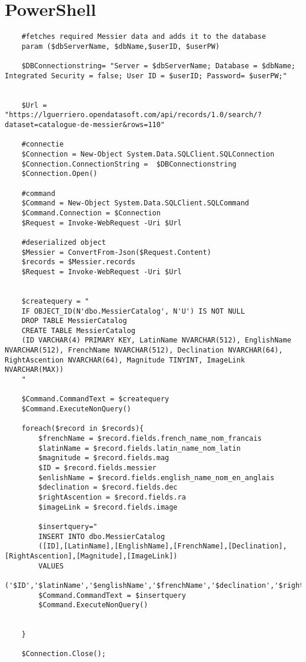 \documentclass[dutch,dit,thesis]{hogentreport}
\begin{document}
\section{PowerShell}
\label{sec:Powershell}
\begin{lstlisting}
    #fetches required Messier data and adds it to the database
    param ($dbServerName, $dbName,$userID, $userPW)

    $DBConnectionstring= "Server = $dbServerName; Database = $dbName; Integrated Security = false; User ID = $userID; Password= $userPW;"


    $Url = "https://lguerriero.opendatasoft.com/api/records/1.0/search/?dataset=catalogue-de-messier&rows=110"

    #connectie
    $Connection = New-Object System.Data.SQLClient.SQLConnection
    $Connection.ConnectionString =  $DBConnectionstring
    $Connection.Open()

    #command
    $Command = New-Object System.Data.SQLClient.SQLCommand
    $Command.Connection = $Connection
    $Request = Invoke-WebRequest -Uri $Url

    #deserialized object
    $Messier = ConvertFrom-Json($Request.Content)
    $records = $Messier.records
    $Request = Invoke-WebRequest -Uri $Url


    $createquery = "
    IF OBJECT_ID(N'dbo.MessierCatalog', N'U') IS NOT NULL
    DROP TABLE MessierCatalog
    CREATE TABLE MessierCatalog
    (ID VARCHAR(4) PRIMARY KEY, LatinName NVARCHAR(512), EnglishName NVARCHAR(512), FrenchName NVARCHAR(512), Declination NVARCHAR(64), RightAscention NVARCHAR(64), Magnitude TINYINT,	ImageLink NVARCHAR(MAX))
    "

    $Command.CommandText = $createquery
    $Command.ExecuteNonQuery()

    foreach($record in $records){
        $frenchName = $record.fields.french_name_nom_francais
        $latinName = $record.fields.latin_name_nom_latin
        $magnitude = $record.fields.mag
        $ID = $record.fields.messier
        $enlishName = $record.fields.english_name_nom_en_anglais
        $declination = $record.fields.dec
        $rightAscention = $record.fields.ra
        $imageLink = $record.fields.image

        $insertquery="
        INSERT INTO dbo.MessierCatalog
        ([ID],[LatinName],[EnglishName],[FrenchName],[Declination],[RightAscention],[Magnitude],[ImageLink])
        VALUES
        ('$ID','$latinName','$englishName','$frenchName','$declination','$rightAscention','$magnitude','$imageLink')"
        $Command.CommandText = $insertquery
        $Command.ExecuteNonQuery()


    }

    $Connection.Close();
\end{lstlisting}


\backmatter{}

\setlength\bibitemsep{2pt} %
\printbibliography[heading=bibintoc]
\end{document}
